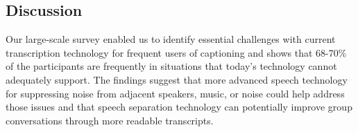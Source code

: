 
\subsection{Discussion}

Our large-scale survey enabled us to identify essential challenges with current transcription technology for frequent users of captioning and shows that 68-70\% of the participants are frequently in situations that today's technology cannot adequately support. The findings suggest that more advanced speech technology for suppressing noise from adjacent speakers, music, or noise could help address those issues and that speech separation technology can potentially improve group conversations through more readable transcripts. 
